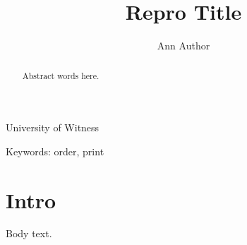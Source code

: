 \documentclass{article}
\def\affil#1{\begin{center}#1\end{center}}
\begin{document}
\title{Repro Title}
\author{Ann Author}
\affil{University of Witness}
\begin{abstract}Abstract words here.\end{abstract}
\noindent Keywords: order, print
\section{Intro}Body text.
\end{document}
